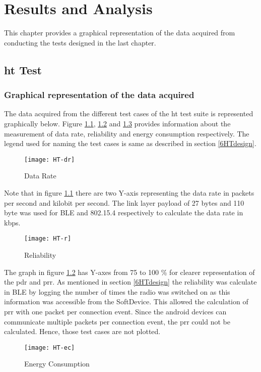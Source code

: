 \chapter{Results and Analysis}
This chapter provides a graphical representation of the data acquired from conducting the tests designed in the last chapter. 

\section{\acrlong{ht} Test}
\subsection{Graphical representation of the data acquired}
The data acquired from the different test cases of the \gls{ht} test suite is represented graphically below. Figure \ref{fig:HT-dr}, \ref{fig:HT-r} and \ref{fig:HT-ec} provides information about the measurement of data rate, reliability and energy consumption respectively. The legend used for naming the test cases is same as described in section \ref{6HTdesign}.

\begin{figure}[h]
\texttt{[image: HT-dr]}
\caption{Data Rate}
\label{fig:HT-dr}
\end{figure}

Note that in figure \ref{fig:HT-dr} there are two Y-axis representing the data rate in packets per second and kilobit per second. The link layer payload of 27 bytes and 110 byte was used for BLE and 802.15.4 respectively to calculate the data rate in kbps.

\begin{figure}[h]
\texttt{[image: HT-r]}
\caption{Reliability}
\label{fig:HT-r}
\end{figure}
The graph in figure \ref{fig:HT-r} has Y-axes from 75 to 100 \% for clearer representation of the \gls{pdr} and \gls{prr}. As mentioned in section \ref{6HTdesign} the reliability was calculate in BLE by logging the number of times the radio was switched on as this information was accessible from the SoftDevice. This allowed the calculation of \gls{prr} with one packet per connection event. Since the android devices can communicate multiple packets per connection event, the \gls{prr} could not be calculated. Hence, those test cases are not plotted.

\begin{figure}[h]
\texttt{[image: HT-ec]}
\caption{Energy Consumption}
\label{fig:HT-ec}
\end{figure}

